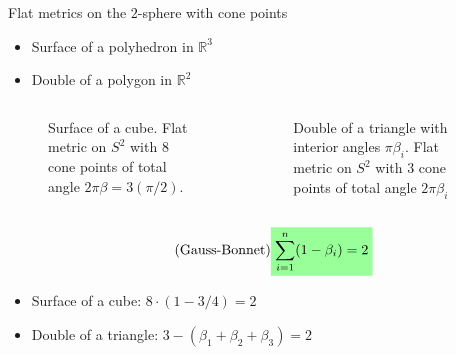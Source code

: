 \documentclass{beamer}
\newcommand{\R}{\mathbb{R}}
\newcommand{\mathcolorbox}[2]{\colorbox{#1}{$\displaystyle #2$}}
\begin{document}
\begin{frame}{Flat metrics on the \(2\)-sphere with cone points}
	\begin{itemize}
		\pause
		\item Surface of a polyhedron in \(\R^3\)
		\pause
		\item Double of a polygon in \(\R^2\)
	\end{itemize}

	\begin{columns}
	\pause	
	\begin{column}{.48\textwidth}
		\begin{figure}
			\caption{Surface of a cube. Flat metric on \(S^2\) with \(8\) cone points of total angle \(2\pi\beta=3(\pi/2)\).}
		\end{figure}
	\end{column}	
	\pause
	\begin{column}{.48\textwidth}
		\begin{figure}
			\caption{Double of a triangle with interior angles \(\pi\beta_i\). Flat metric on \(S^2\) with \(3\) cone points of total angle \(2\pi\beta_i\)}
		\end{figure}
	\end{column}
\end{columns}
\pause
\begin{equation}\tag{Gauss-Bonnet}
	\mathcolorbox{green!40}{
		\sum_{i=1}^n (1-\beta_i) = 2
	}
\end{equation}

\begin{itemize}
	\pause
	\item Surface of a cube: \(8 \cdot (1-3/4) = 2\) 
	\pause
	\item Double of a triangle: \(3 - (\beta_1+\beta_2 + \beta_3) = 2\)
\end{itemize}

\end{frame}
\end{document}

